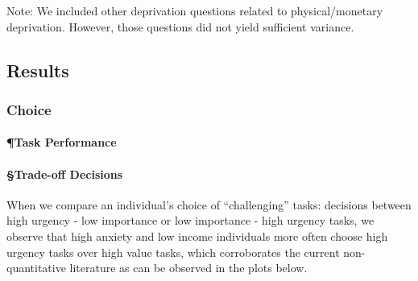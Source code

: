 Note: We included other deprivation questions related to
physical/monetary deprivation. However, those questions did not yield
sufficient variance.

\hypertarget{results}{%
\subsection{Results}\label{results}}

\hypertarget{choice}{%
\subsubsection{Choice}\label{choice}}

\hypertarget{task-performance}{%
\paragraph{¶Task Performance}\label{task-performance}}

\hypertarget{trade-off-decisions}{%
\paragraph{§Trade-off Decisions}\label{trade-off-decisions}}

When we compare an individual's choice of ``challenging'' tasks:
decisions between high urgency - low importance or low importance - high
urgency tasks, we observe that high anxiety and low income individuals
more often choose high urgency tasks over high value tasks, which
corroborates the current non-quantitative literature as can be observed
in the plots below.

